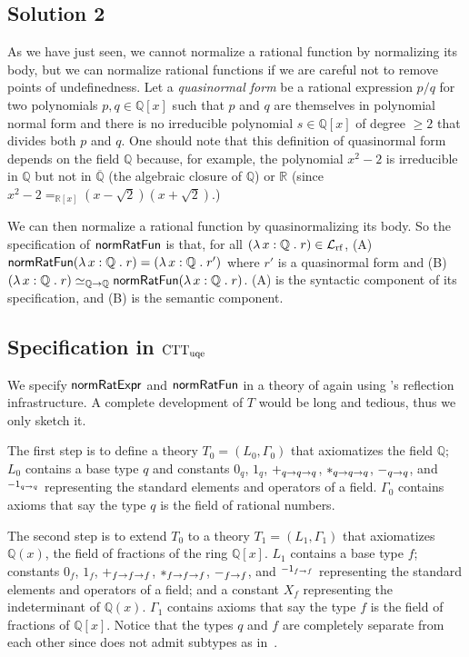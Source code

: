 \documentclass[fleqn]{llncs}
\newcommand{\QQ}{\ensuremath{\mathbb{Q}}}
\newcommand{\RR}{\ensuremath{\mathbb{R}}}
\newcommand{\NRE}{\ensuremath{\mname{normRatExpr}}}
\newcommand{\NRF}{\ensuremath{\mname{normRatFun}}}
\newcommand{\funQ}[1]{\ensuremath{\LambdaApp x : \QQ \mdot #1}}
\newcommand{\Langrf}{\ensuremath{\mathcal{L}}_{\rm rf}}
\begin{document}
\subsection{Solution 2}

As we have just seen, we cannot normalize a rational function by
normalizing its body, but we can normalize rational functions if we
are careful not to remove points of undefinedness.  Let a
\emph{quasinormal form} be a rational expression $p/q$ for two
polynomials $p,q \in \QQ[x]$ such that $p$ and $q$ are themselves in
polynomial normal form and there is no irreducible polynomial $s \in
\QQ[x]$ of degree $\ge 2$ that divides both $p$ and $q$.  One should
note that this definition of quasinormal form depends on the field
$\QQ$ because, for example, the polynomial $x^2 - 2$ is irreducible in
$\QQ$ but not in $\overline{\QQ}$ (the algebraic closure of $\QQ$) or
$\RR$ (since $x^2 - 2 =_{\RR[x]} (x - \sqrt{2})(x + \sqrt{2})$.)

\bsp We can then normalize a rational function by quasinormalizing its
body.  So the specification of $\NRF$ is that, for all $(\funQ{r}) \in
\Langrf$, (A)~$\NRF(\funQ{r}) = (\funQ{r'})$ where $r'$ is a
quasinormal form and (B)~$(\funQ{r}) \simeq_{\QQ \rightarrow \QQ}
\NRF(\funQ{r})$.  (A) is the syntactic component of its specification,
and (B) is the semantic component.\esp

\subsection{Specification in ${\rm CTT}_{\rm uqe}$}

We specify {\NRE} and {\NRF} in a theory of {\churchuqe} again using
{\churchuqe}'s reflection infrastructure.  A complete development of
$T$ would be long and tedious, thus we only sketch it.

The first step is to define a theory $T_0 = (L_0,\Gamma_0)$ that
axiomatizes the field $\QQ$;  $L_0$ contains a
base type $q$ and constants $0_q$, $1_q$, $+_{q \rightarrow q \rightarrow q}$,
$*_{q \rightarrow q \rightarrow q}$, $-_{q \rightarrow q}$, and
$\phantom{}^{{-1}_{q \rightarrow q}}$ representing the standard elements
and operators of a field.  $\Gamma_0$ contains axioms that say the
type $q$ is the field of rational numbers.

The second step is to extend $T_0$ to a theory $T_1 = (L_1,\Gamma_1)$
that axiomatizes $\QQ(x)$, the field of fractions of the ring
$\QQ[x]$.  $L_1$ contains a base type $f$; constants $0_f$, $1_f$,
$+_{f \rightarrow f \rightarrow f}$, $*_{f \rightarrow f \rightarrow f}$, $-_{f
  \rightarrow f}$, and $\phantom{}^{{-1}_{f \rightarrow f}}$ representing the
standard elements and operators of a field; and a constant $X_f$
representing the indeterminant of $\QQ(x)$.  $\Gamma_1$ contains
axioms that say the type $f$ is the field of fractions of $\QQ[x]$.
Notice that the types $q$ and $f$ are completely separate from each
other since {\churchuqe} does not admit subtypes as
in~\cite{Farmer93b}.
\end{document}
